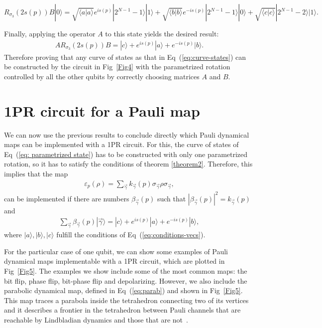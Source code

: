 \documentclass[10pt,letterpaper]{article} %
\newcommand{\fref}[1]{Fig~\ref{#1}}
\newcommand{\eref}[1]{Eq~(\ref{#1})}
\begin{document}
$$
R_{\sigma_3}(2s(p))B|0\rangle =\sqrt{\langle a | a \rangle} e^{is(p)} |2^{N-1}-1\rangle |1\rangle + \sqrt{\langle b | b \rangle} e^{-is(p)} |2^{N-1}-1\rangle |0\rangle + \sqrt{\langle c | c \rangle} |2^{N-1}-2\rangle |1\rangle.
$$

Finally, applying the  operator $A$ to this state yields the desired result:  
\begin{align*}
AR_{\sigma_3}(2s(p))B = |c\rangle + e^{is(p)} |a\rangle + e^{-is(p)} |b\rangle.
\end{align*}
Therefore proving that any curve of states as that in \eref{eq:curve-states} 
can be constructed by the circuit in  \fref{Fig4} with the parametrized rotation 
controlled by all the other qubits 
by correctly choosing matrices $A$ and $B$.

 
\section{1PR circuit for a Pauli map} %
\label{sec: 1PR circuit for a Pauli map}

We can now use the previous results to conclude directly which Pauli dynamical maps
can be implemented with a 1PR circuit.
For this, the curve of states of \eref{eq: parametrized state} 
has to be constructed with only one parametrized rotation,
so it has to satisfy the conditions of theorem \ref{theorem2}.
Therefore, this implies that the map
\begin{eqnarray}
\varepsilon_p(\rho) = \sum_{\vec{\gamma}} k_{\vec{\gamma}}(p) \sigma_{\vec{\gamma}} \rho \sigma_{\vec{\gamma}},
\end{eqnarray}
can be implemented  if there are numbers $\beta_{\vec{\gamma}}(p)$ such that $|\beta_{\vec{\gamma}}(p)|^2 = k_{\vec{\gamma}}(p)$ and
\begin{eqnarray}
\label{eq:vec}
\sum_{\vec{\gamma}} \beta_{\vec{\gamma}}(p) |\vec{\gamma}\rangle = |c\rangle +  e^{is(p)} |a\rangle + e^{-is(p)}|b\rangle,
\end{eqnarray}
where $|a\rangle,|b\rangle,|c\rangle$ fulfill
the conditions of \eref{eq:conditions-vecs}.

For the particular case of one qubit, we can show some examples of Pauli
dynamical maps implementable with a 1PR circuit, which are plotted in
\fref{Fig5}. 
The examples we show include some of the most common maps: the bit flip, phase flip, bit-phase flip and depolarizing.
However, we also include the parabolic dynamical map,
defined in \eref{eq:parab} and shown in \fref{Fig5}.
This map traces a parabola inside the tetrahedron connecting two of its vertices
and it describes a frontier in the tetrahedron between Pauli channels
that are reachable by Lindbladian dynamics and those that are not~\cite{Davalos}.
\end{document}
